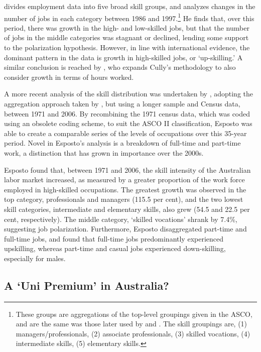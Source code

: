 \citet{Cully1999} divides employment data into five broad skill groups, and analyzes changes in the number of jobs in each category between 1986 and 1997.\footnote{These groups are aggregations of the top-level groupings given in the ASCO, and are the same was those later used by \citet{Wooden2000} and \citet{Esposto2012}. The skill groupings are, (1) managers/professionals, (2) associate professionals, (3) skilled vocations, (4) intermediate skills, (5) elementary skills.} He finds that, over this period, there was growth in the high- and low-skilled jobs, but that the number of jobs in the middle categories was stagnant or declined, lending some support to the polarization hypothesis. However, in line with international evidence, the dominant pattern in the data is growth in high-skilled jobs, or `up-skilling.' A similar conclusion is reached by \citet{Wooden2000}, who expands Cully's methodology to also consider growth in terms of hours worked.

A more recent analysis of the skill distribution was undertaken by \citet{Esposto2012}, adopting the aggregation approach taken by \citet{Cully1999}, but using a longer sample and Census data, between 1971 and 2006. By recombining the 1971 census data, which was coded using an obsolete coding scheme, to suit the ASCO II classification, Esposto was able to create a comparable series of the levels of occupations over this 35-year period. Novel in Esposto's analysis is a breakdown of full-time and part-time work, a distinction that has grown in importance over the 2000s.

Esposto found that, between 1971 and 2006, the skill intensity of the Australian labor market increased, as measured by a greater proportion of the work force employed in high-skilled occupations. The greatest growth was observed in the top category, professionals and managers (115.5 per cent), and the two lowest skill categories, intermediate and elementary skills, also grew (54.5 and 22.5 per cent, respectively). The middle category, `skilled vocations' shrank by 7.4\%, suggesting job polarization. Furthermore, Esposto disaggregated part-time and full-time jobs, and found that full-time jobs predominantly experienced upskilling, whereas part-time and casual jobs experienced down-skilling, especially for males.

\subsection{A `Uni Premium' in Australia?}

